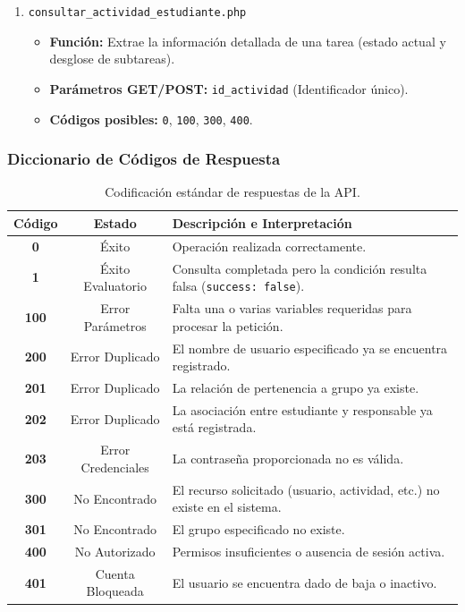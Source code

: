 \begin{enumerate}
    \item \texttt{consultar\_actividad\_estudiante.php}
    \begin{itemize}
        \item \textbf{Función:} Extrae la información detallada de una tarea (estado actual y desglose de subtareas).
        \item \textbf{Parámetros GET/POST:} \texttt{id\_actividad} (Identificador único).
        \item \textbf{Códigos posibles:} \texttt{0}, \texttt{100}, \texttt{300}, \texttt{400}.
    \end{itemize}
\end{enumerate}

\subsubsection{Diccionario de Códigos de Respuesta}

\begin{table}[H]
\centering
\small
{}
\begin{tabularx}{\textwidth}{c c X}
\toprule
\rowcolor{azulPastelApagado}
\textbf{\color{textoOscuro}Código} & \textbf{\color{textoOscuro}Estado} & \textbf{\color{textoOscuro}Descripción e Interpretación} \\
\midrule
\textbf{0} & Éxito & Operación realizada correctamente. \\
\textbf{1} & Éxito Evaluatorio & Consulta completada pero la condición resulta falsa (\texttt{success: false}). \\
\textbf{100} & Error Parámetros & Falta una o varias variables requeridas para procesar la petición. \\
\textbf{200} & Error Duplicado & El nombre de usuario especificado ya se encuentra registrado. \\
\textbf{201} & Error Duplicado & La relación de pertenencia a grupo ya existe. \\
\textbf{202} & Error Duplicado & La asociación entre estudiante y responsable ya está registrada. \\
\textbf{203} & Error Credenciales & La contraseña proporcionada no es válida. \\
\textbf{300} & No Encontrado & El recurso solicitado (usuario, actividad, etc.) no existe en el sistema. \\
\textbf{301} & No Encontrado & El grupo especificado no existe. \\
\textbf{400} & No Autorizado & Permisos insuficientes o ausencia de sesión activa. \\
\textbf{401} & Cuenta Bloqueada & El usuario se encuentra dado de baja o inactivo. \\
\bottomrule
\end{tabularx}
\caption{Codificación estándar de respuestas de la API.}
\end{table}